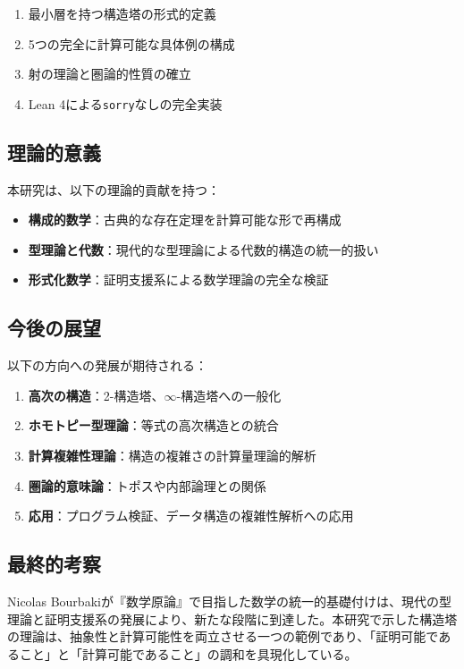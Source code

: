 \documentclass[a4paper,12pt]{ltjsarticle}
\theoremstyle{definition}
\begin{document}
\begin{enumerate}
\item 最小層を持つ構造塔の形式的定義
\item 5つの完全に計算可能な具体例の構成
\item 射の理論と圏論的性質の確立
\item Lean 4による\texttt{sorry}なしの完全実装
\end{enumerate}

\subsection{理論的意義}

本研究は、以下の理論的貢献を持つ：

\begin{itemize}
\item \textbf{構成的数学}：古典的な存在定理を計算可能な形で再構成
\item \textbf{型理論と代数}：現代的な型理論による代数的構造の統一的扱い
\item \textbf{形式化数学}：証明支援系による数学理論の完全な検証
\end{itemize}

\subsection{今後の展望}

以下の方向への発展が期待される：

\begin{enumerate}
\item \textbf{高次の構造}：2-構造塔、$\infty$-構造塔への一般化
\item \textbf{ホモトピー型理論}：等式の高次構造との統合
\item \textbf{計算複雑性理論}：構造の複雑さの計算量理論的解析
\item \textbf{圏論的意味論}：トポスや内部論理との関係
\item \textbf{応用}：プログラム検証、データ構造の複雑性解析への応用
\end{enumerate}

\subsection{最終的考察}

Nicolas Bourbakiが『数学原論』で目指した数学の統一的基礎付けは、現代の型理論と証明支援系の発展により、新たな段階に到達した。本研究で示した構造塔の理論は、抽象性と計算可能性を両立させる一つの範例であり、「証明可能であること」と「計算可能であること」の調和を具現化している。
\end{document}
